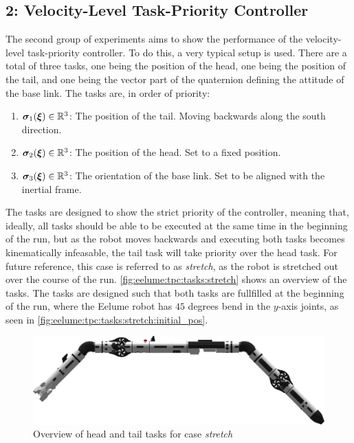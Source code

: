 \subsection*{2: Velocity-Level Task-Priority Controller}
The second group of experiments aims to show the performance of the velocity-level
task-priority controller. To do this, a very typical setup is used. There are a total
of three tasks, one being the position of the head, one being the position of the tail,
and one being the vector part of the quaternion defining the attitude of the base link.
The tasks are, in order of priority:
\begin{enumerate}
    \item \(\bm{\sigma}_1(\bm{\xi}) \in \mathbb{R}^3\): The position of the tail. Moving backwards along the south direction.
    \item \(\bm{\sigma}_2(\bm{\xi}) \in \mathbb{R}^3\): The position of the head. Set to a fixed position.
    \item \(\bm{\sigma}_3(\bm{\xi}) \in \mathbb{R}^3\): The orientation of the base link. Set to be aligned with the inertial frame.
\end{enumerate}
The tasks are designed to
show the strict priority of the controller, meaning that, ideally, all tasks
should be able to be executed at the same time in the beginning of the run, but
as the robot moves backwards and executing both tasks becomes kinematically infeasable,
the tail task will take priority over the head task. For future reference, this
case is referred to as \textit{stretch}, as the robot is stretched out over
the course of the run. \autoref{fig:eelume:tpc:tasks:stretch} shows an overview of the tasks.
The tasks are designed such that both tasks are fullfilled at the beginning of the run,
where the Eelume robot has \(45\) degrees bend in the \(y\)-axis joints, as
seen in \autoref{fig:eelume:tpc:tasks:stretch:initial_pos}.

\begin{figure}[!ht]
    \centering
    \includegraphics[width=\textwidth]{assets/side-view-45-joints.png}
    \caption{Overview of head and tail tasks for case \textit{stretch}}
    \label{fig:eelume:tpc:tasks:stretch:initial_pos}
\end{figure}

